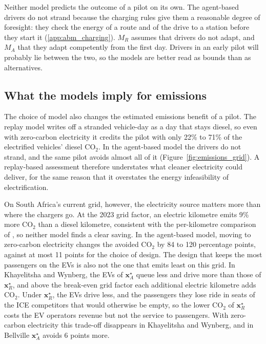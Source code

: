 \documentclass{elsarticle}
\newcommand{\MR}{\ensuremath{M_R}}
\newcommand{\MA}{\ensuremath{M_A}}
\newcommand{\xR}{\ensuremath{\mathbf{x}_R^{\star}}}
\newcommand{\xA}{\ensuremath{\mathbf{x}_A^{\star}}}
\begin{document}
Neither model predicts the outcome of a pilot on its own. The agent-based drivers do not strand because the charging rules give them a reasonable degree of foresight: they check the energy of a route and of the drive to a station before they start it (\ref{app:abm_charging}). \MR{} assumes that drivers do not adapt, and \MA{} that they adapt competently from the first day. Drivers in an early pilot will probably lie between the two, so the models are better read as bounds than as alternatives.

\subsection{What the models imply for emissions}
\label{sec:discussion_emissions}

The choice of model also changes the estimated emissions benefit of a pilot. The replay model writes off a stranded vehicle-day as a day that stays diesel, so even with zero-carbon electricity it credits the pilot with only 22\% to 71\% of the electrified vehicles' diesel CO$_2$. In the agent-based model the drivers do not strand, and the same pilot avoids almost all of it (Figure~\ref{fig:emissions_grid}). A replay-based assessment therefore understates what cleaner electricity could deliver, for the same reason that it overstates the energy infeasibility of electrification.

On South Africa's current grid, however, the electricity source matters more than where the chargers go. At the 2023 grid factor, an electric kilometre emits 9\% more CO$_2$ than a diesel kilometre, consistent with the per-kilometre comparison of \citet{sello2026_embt_in_cpt}, so neither model finds a clear saving. In the agent-based model, moving to zero-carbon electricity changes the avoided CO$_2$ by 84 to 120 percentage points, against at most 11 points for the choice of design. The design that keeps the most passengers on the EVs is also not the one that emits least on this grid. In Khayelitsha and Wynberg, the EVs of \xA{} queue less and drive more than those of \xR, and above the break-even grid factor each additional electric kilometre adds CO$_2$. Under \xR, the EVs drive less, and the passengers they lose ride in seats of the ICE competitors that would otherwise be empty, so the lower CO$_2$ of \xR{} costs the EV operators revenue but not the service to passengers. With zero-carbon electricity this trade-off disappears in Khayelitsha and Wynberg, and in Bellville \xA{} avoids 6 points more.
\end{document}
